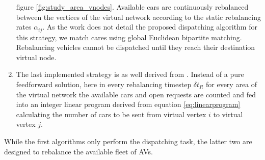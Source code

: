 \begin{enumerate}
figure \ref{fig:study_area_vnodes}. Available cars are continuously rebalanced between
the vertices of the virtual network according to the static rebalancing rates $\alpha_{ij}$. As the
work does not detail the proposed dispatching algorithm for this strategy, we match cares
using global Euclidean bipartite matching. Rebalancing vehicles cannot be dispatched until they reach their destination virtual node.
\item The last implemented strategy is as well derived from \cite{pavone2011load}. Instead of a pure
feedforward solution, here  in every rebalancing timestep $\delta t_R$
for every area of the virtual network the available cars and open requests are counted
and fed into an integer linear program derived from equation \ref{eq:linearprogram}
calculating the number of cars to be sent from virtual vertex $i$ to virtual vertex $j$.
\end{enumerate}

While the first algorithms only perform the dispatching task, the latter two
are designed to rebalance the available fleet of AVs.
